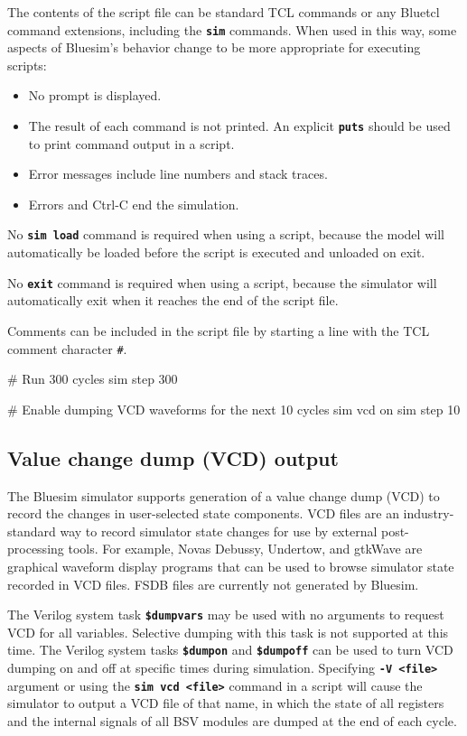 \documentclass{article}
\newenvironment{centerboxverbatim}
  {\center
   \boxedverbatim}
  {\endboxedverbatim
  {\endcenter }}
\begin{document}
The contents of the script file can be standard TCL commands or
any Bluetcl command extensions, including the {\bf\tt sim} commands.
When used in this way, some aspects of Bluesim's behavior change to be
more appropriate for executing scripts:
\begin{itemize}
\item
No prompt is displayed.
\item
The result of each command is not printed.  An explicit {\bf\tt puts}
should be used to print command output in a script.
\item
Error messages include line numbers and stack traces.
\item
Errors and Ctrl-C end the simulation.
\end{itemize}

No {\bf\tt sim load} command is required when using a script, because
the model will automatically be loaded before the script is executed
and unloaded on exit.

No {\bf\tt exit} command is required when using a script, because the
simulator will automatically exit when it reaches the end of the
script file.

Comments can be included in the script file by starting a line
with the TCL comment character {\tt \#}.

\begin{centerboxverbatim}
# Run 300 cycles
sim step 300

# Enable dumping VCD waveforms for the next 10 cycles
sim vcd on
sim step 10
\end{centerboxverbatim}


\subsection{Value change dump (VCD) output}

The Bluesim simulator supports generation of a value
change dump (VCD) to record the changes in user-selected state
components.  VCD files are an industry-standard way to record
simulator state changes for use by external post-processing tools. For
example, Novas Debussy, Undertow, and gtkWave are graphical waveform
display programs that can be used to browse simulator state recorded
in VCD files.    FSDB  files are currently not generated by Bluesim.

The Verilog system task {\bf\tt \$dumpvars} may be used with no arguments
to request VCD for all variables.  Selective dumping with this task
is not supported at this time.  The Verilog system tasks {\bf\tt \$dumpon}
and {\bf\tt \$dumpoff} can be used to turn VCD dumping on and off at
specific times during simulation.
Specifying {\bf\tt -V <file>} argument or using the {\bf\tt sim vcd <file>}
command in a script will cause the simulator to output a
VCD file of that name, in which the state of all registers
and the internal signals of all BSV modules are dumped at the end of
each cycle.
\end{document}
